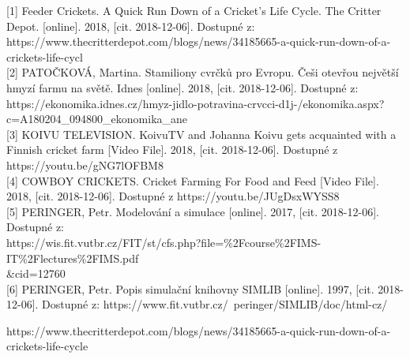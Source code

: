 \documentclass[a4paper, 12pt]{article}
\begin{document}
[1] Feeder Crickets. A Quick Run Down of a Cricket's Life Cycle. The Critter Depot. [online]. 2018, [cit. 2018-12-06]. Dostupné z: https://www.thecritterdepot.com/blogs/news/34185665-a-quick-run-down-of-a-crickets-life-cycl\\

[2] PATOČKOVÁ, Martina. Stamiliony cvrčků pro Evropu. Češi otevřou největší hmyzí farmu na světě. Idnes [online]. 2018, [cit. 2018-12-06]. Dostupné z: https://ekonomika.idnes.cz/hmyz-jidlo-potravina-crvcci-d1j-/ekonomika.aspx?c=A180204\_094800\_ekonomika\_ane\\

[3] KOIVU TELEVISION. KoivuTV and Johanna Koivu gets acquainted with a Finnish cricket farm [Video File]. 2018, [cit. 2018-12-06]. Dostupné z https://youtu.be/gNG7lOFBM8\\

[4] COWBOY CRICKETS. Cricket Farming For Food and Feed [Video File]. 2018, [cit. 2018-12-06]. Dostupné z https://youtu.be/JUgDsxWYSS8\\

[5] PERINGER, Petr. Modelování a simulace [online]. 2017, [cit. 2018-12-06]. Dostupné z:\\ https://wis.fit.vutbr.cz/FIT/st/cfs.php?file=\%2Fcourse\%2FIMS-IT\%2Flectures\%2FIMS.pdf\\\&cid=12760 \\

[6] PERINGER, Petr. Popis simulační knihovny SIMLIB [online]. 1997, [cit. 2018-12-06]. Dostupné z: https://www.fit.vutbr.cz/~peringer/SIMLIB/doc/html-cz/


https://www.thecritterdepot.com/blogs/news/34185665-a-quick-run-down-of-a-crickets-life-cycle
\end{document}
